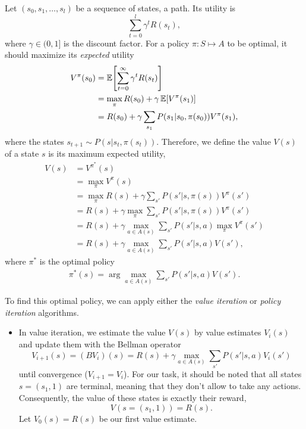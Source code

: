 \documentclass[11pt, a4paper]{article}
\begin{document}
\begin{enumerate}
    \begin{solution}
        Let $(s_0, s_1, \dots, s_l)$ be a sequence of states, \ie{} a path. Its utility is
        \begin{equation*}
            \sum_{t = 0}^{l} \gamma^t R(s_t),
        \end{equation*}
        where $\gamma \in (0, 1]$ is the discount factor. For a policy $\pi : S \mapsto A$ to be optimal, it should maximize its \emph{expected} utility
        \begin{align*}
            V^\pi(s_0) & = \E \sbk*{\sum_{t = 0}^\infty \gamma^t R(s_t)} \\
            & = \max_\pi R(s_0) + \gamma \, \E \sbk*{V^\pi(s_1)} \\
            & = R(s_0) + \gamma \sum_{s_1} P(s_1 | s_0, \pi(s_0)) V^\pi(s_1),
        \end{align*}
        where the states $s_{t+1} \sim P(s | s_t, \pi(s_t))$. Therefore, we define the value $V(s)$ of a state $s$ is its maximum expected utility, \ie{}
        \begin{align*}
            V(s) & = V^{\pi^*}(s) \\
            & = \max_\pi V^\pi(s) \\
            & = \max_\pi R(s) + \gamma \sum_{s'} P(s' | s, \pi(s)) V^\pi(s') \\
            & = R(s) + \gamma \max_\pi \sum_{s'} P(s' | s, \pi(s)) V^\pi(s') \\
            & = R(s) + \gamma \max_{a \in A(s)} \sum_{s'} P(s' | s, a) \max_\pi V^\pi(s') \\
            & = R(s) + \gamma \max_{a \in A(s)} \sum_{s'} P(s' | s, a) V(s') ,
        \end{align*}
        where $\pi^*$ is the optimal policy
        \begin{align*}
            \pi^*(s) = \arg \max_{a \in A(s)} \sum_{s'} P(s' | s, a) V(s') .
        \end{align*}

        To find this optimal policy, we can apply either the \emph{value iteration} or \emph{policy iteration} algorithms.

        \begin{itemize}
            \item In value iteration, we estimate the value $V(s)$ by value estimates $V_i(s)$ and update them with the Bellman operator
            \begin{equation*}
                V_{i+1}(s) = (B V_i)(s) = R(s) + \gamma \max_{a \in A(s)} \sum_{s'} P(s' | s, a) V_{i}(s')
            \end{equation*}
            until convergence ($V_{i + 1} = V_i$). For our task, it should be noted that all states $s = (s_1, 1)$ are terminal, meaning that they don't allow to take any actions. Consequently, the value of these states is exactly their reward, \ie{}
            \begin{equation*}
                V(s = (s_1, 1)) = R(s) .
            \end{equation*}
            Let $V_0(s) = R(s)$ be our first value estimate.


\end{itemize}
\end{solution}
\end{enumerate}
\end{document}
